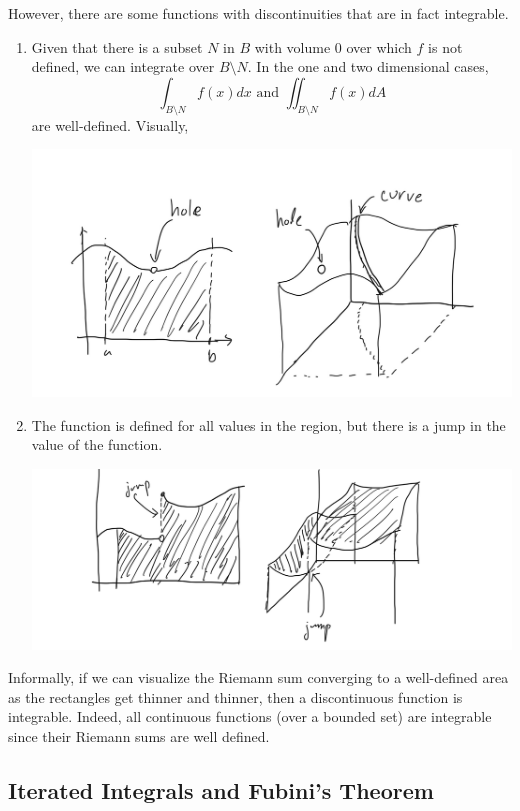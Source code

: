   However, there are some functions with discontinuities that are in fact integrable. 
  \begin{enumerate}
    \item Given that there is a subset $N$ in $B$ with volume $0$ over which $f$ is not defined, we can integrate over $B \setminus N$. In the one and two dimensional cases, 
    \[\int_{B \setminus N} f(x) dx \text{ and } \iint_{B\setminus N} f(x) dA\]
    are well-defined. Visually, 
    \begin{center}
      \includegraphics[scale=0.2]{img/Integrable_Hole_Function.jpg}
    \end{center}
    \item The function is defined for all values in the region, but there is a jump in the value of the function. 
    \begin{center}
      \includegraphics[scale=0.23]{img/Integrable_Jump_Function.PNG}
    \end{center}
  \end{enumerate}
  Informally, if we can visualize the Riemann sum converging to a well-defined area as the rectangles get thinner and thinner, then a discontinuous function is integrable. Indeed, all continuous functions (over a bounded set) are integrable since their Riemann sums are well defined. 


\subsection{Iterated Integrals and Fubini's Theorem} 

